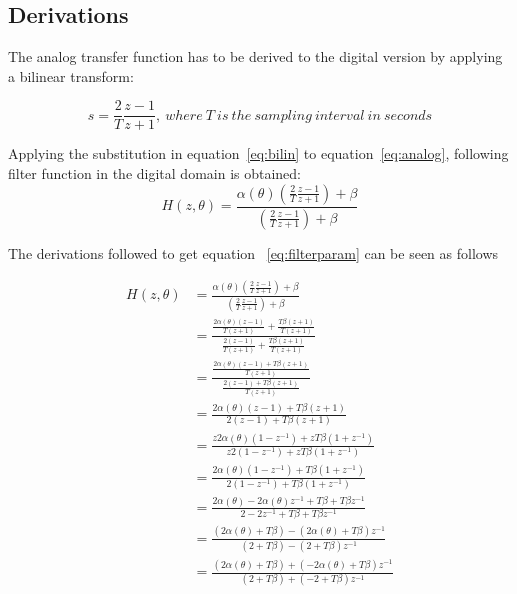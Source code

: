\documentclass[journal]{IEEEtran}
\begin{document}
\pagebreak
\begin{appendices}
\section{Derivations}


The analog transfer function has to be derived to the digital version by applying a bilinear transform:

\begin{equation}\label{eq:bilin}
s = \frac{2}{T} \frac{z-1}{z+1},\: where\:T\:is\:the\:sampling\:interval\:in\:seconds
\end{equation}


Applying the substitution in equation~\ref{eq:bilin} to equation~\ref{eq:analog}, following filter function in the digital domain is obtained:
\begin{equation}\label{eq:filter}
H\left( z,\theta\right) = \frac{\alpha (\theta)(\frac{2}{T} \frac{z-1}{z+1})+\beta}{(\frac{2}{T} \frac{z-1}{z+1})+\beta}
\end{equation}

The derivations followed to get equation ~\ref{eq:filterparam} can be seen as follows

\begin{equation*}\label{eq:DerivationFilterCoeff}
\begin{split}
H\left( z,\theta\right) &=\frac{\alpha (\theta)(\frac{2}{T} \frac{z-1}{z+1})+\beta}{(\frac{2}{T} \frac{z-1}{z+1})+\beta}\\
                                   &= \frac{\frac{2\alpha (\theta)(z-1)}{T(z+1)}+\frac{T\beta(z+1)}{T(z+1)}}{\frac{2(z-1)}{T(z+1)}+\frac{T\beta(z+1)}{T(z+1)}}\\  
			   &=\frac{\frac{2\alpha (\theta)(z-1)+T\beta(z+1)}{T(z+1)}}{\frac{2(z-1)+T\beta(z+1)}{T(z+1)}}\\
			  &=\frac{2\alpha (\theta)(z-1)+T\beta(z+1)}{2(z-1)+T\beta(z+1)}\\
			 &=\frac{z2\alpha (\theta)(1-z^{-1})+zT\beta(1+z^{-1})}{z2(1-z^{-1})+zT\beta(1+z^{-1})}\\
			&=\frac{2\alpha (\theta)(1-z^{-1})+T\beta(1+z^{-1})}{2(1-z^{-1})+T\beta(1+z^{-1})}\\
			&=\frac{2\alpha (\theta)-2\alpha (\theta)z^{-1}+T\beta+T\beta z^{-1}}{2-2z^{-1}+T\beta+T\beta z^{-1}}\\
			&=\frac{(2\alpha (\theta)+T\beta)-(2\alpha (\theta)+T\beta)z^{-1}}{(2+T\beta)-(2+T\beta)z^{-1}}\\
			&=\frac{(2\alpha (\theta)+T\beta)+(-2\alpha (\theta)+T\beta)z^{-1}}{(2+T\beta)+(-2+T\beta)z^{-1}}\\
\end{split}
\end{equation*} 




\end{appendices}
\end{document}
